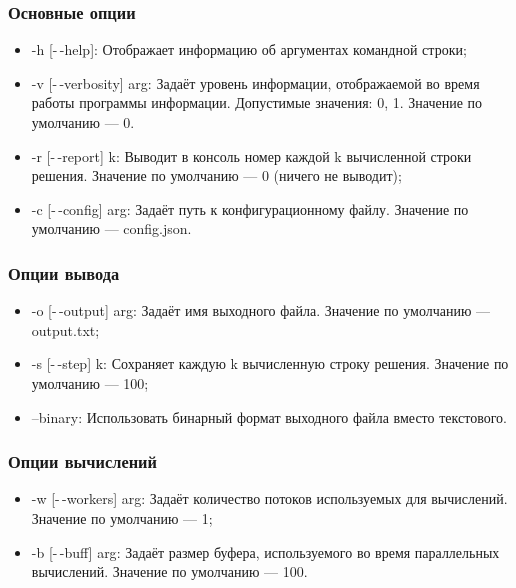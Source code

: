 \documentclass{fefu}
\begin{document}
            \subsubsection{Основные опции}
                \begin{itemize}
                    \item \textsf{-h [-\,-help]}: Отображает информацию об аргументах командной строки;
                    \item \textsf{-v [-\,-verbosity] arg}: Задаёт уровень информации, отображаемой во время работы программы информации. Допустимые значения: 0, 1. Значение по умолчанию --- 0.
                    \item \textsf{-r [-\,-report] k}: Выводит в консоль номер каждой \textsf{k} вычисленной строки решения. Значение по умолчанию --- 0 (ничего не выводит);
                    \item \textsf{-c [-\,-config] arg}: Задаёт путь к конфигурационному файлу. Значение по умолчанию --- config.json.
                \end{itemize}
            \subsubsection{Опции вывода}
                \begin{itemize}
                    \item \textsf{-o [-\,-output] arg}: Задаёт имя выходного файла. Значение по умолчанию --- output.txt;
                    \item \textsf{-s [-\,-step] k}: Сохраняет каждую \textsf{k} вычисленную строку решения. Значение по умолчанию --- 100; 
                    \item \textsf{--binary}: Использовать бинарный формат выходного файла вместо текстового.
                \end{itemize}
            \subsubsection{Опции вычислений}
                \begin{itemize}
                    \item \textsf{-w [-\,-workers] arg}: Задаёт количество потоков используемых для вычислений. Значение по умолчанию --- 1;
                    \item \textsf{-b [-\,-buff] arg}: Задаёт размер буфера, используемого во время параллельных вычислений. Значение по умолчанию --- 100.
                \end{itemize}
\end{document}
